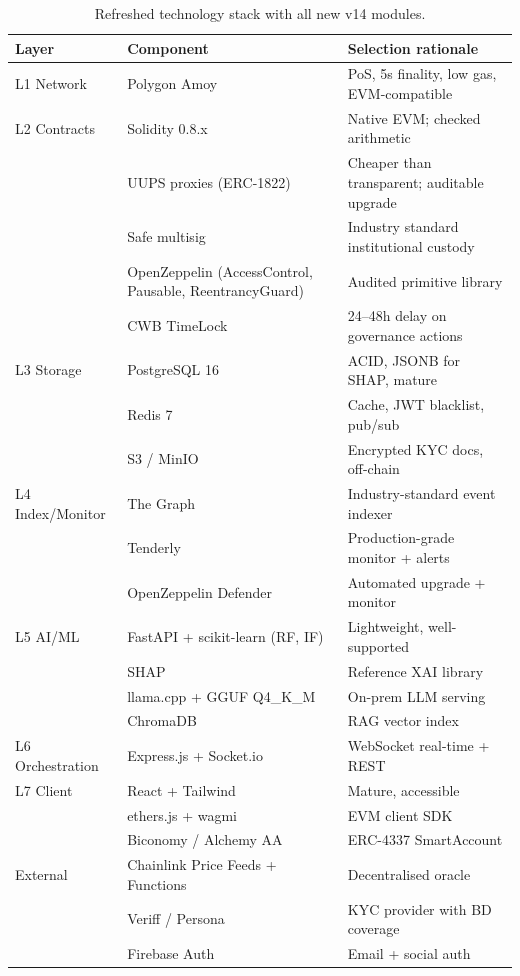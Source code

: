 \documentclass[12pt,a4paper]{report}
\begin{document}
\begin{table}[!t]
\centering
\caption{Refreshed technology stack with all new v14 modules.}
\label{tab:stack}
\small
\begin{tabularx}{\linewidth}{@{}p{2.4cm}p{2.8cm}Y@{}}
\toprule
\textbf{Layer} & \textbf{Component} & \textbf{Selection rationale} \\
\midrule
L1 Network & Polygon Amoy & PoS, 5s finality, low gas, EVM-compatible \\
L2 Contracts & Solidity 0.8.x & Native EVM; checked arithmetic \\
& UUPS proxies (ERC-1822) & Cheaper than transparent; auditable upgrade \\
& Safe multisig & Industry standard institutional custody \\
& OpenZeppelin (AccessControl, Pausable, ReentrancyGuard) & Audited primitive library \\
& CWB TimeLock & 24--48h delay on governance actions \\
L3 Storage & PostgreSQL 16 & ACID, JSONB for SHAP, mature \\
& Redis 7 & Cache, JWT blacklist, pub/sub \\
& S3 / MinIO & Encrypted KYC docs, off-chain \\
L4 Index/Monitor & The Graph & Industry-standard event indexer \\
& Tenderly & Production-grade monitor + alerts \\
& OpenZeppelin Defender & Automated upgrade + monitor \\
L5 AI/ML & FastAPI + scikit-learn (RF, IF) & Lightweight, well-supported \\
& SHAP & Reference XAI library~\cite{lundberg2017shap} \\
& llama.cpp + GGUF Q4\_K\_M & On-prem LLM serving \\
& ChromaDB & RAG vector index \\
L6 Orchestration & Express.js + Socket.io & WebSocket real-time + REST \\
L7 Client & React + Tailwind & Mature, accessible \\
& ethers.js + wagmi & EVM client SDK \\
& Biconomy / Alchemy AA & ERC-4337 SmartAccount \\
External & Chainlink Price Feeds + Functions & Decentralised oracle \\
& Veriff / Persona & KYC provider with BD coverage \\
& Firebase Auth & Email + social auth \\
\bottomrule
\end{tabularx}
\end{table}
\end{document}
